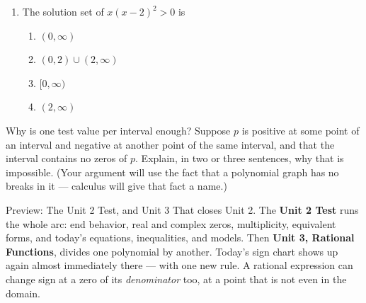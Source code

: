 \documentclass[10pt]{article}
\begin{document}
\begin{enumerate}[itemsep=10pt]
\begin{enumerate}[label=(\alph*), itemsep=6pt]
  \item First differences: \blank{6cm}
  \item Second differences: \blank{5cm}
  \item Third differences: \blank{4cm}
  \item Which regression --- linear, quadratic, cubic, or quartic --- fits this
        data exactly, and how do the differences tell you?
        \quad \blank{5cm}
  \item The calculator returns the coefficients. Name one thing it does
        \textit{not} decide for you. \quad \blank{5cm}
\end{enumerate}

\item The solution set of $x(x-2)^2 > 0$ is

\begin{enumerate}[label=\Alph*., itemsep=3pt]
  \item $(0, \infty)$
  \item $(0,2) \cup (2,\infty)$
  \item $[0, \infty)$
  \item $(2, \infty)$
\end{enumerate}

\end{enumerate}

\vspace{0.1in}

\boxguard
\begin{extensionbox}
Why is one test value per interval enough? Suppose $p$ is positive at some
point of an interval and negative at another point of the same interval, and
that the interval contains no zeros of $p$. Explain, in two or three sentences,
why that is impossible. (Your argument will use the fact that a polynomial
graph has no breaks in it --- calculus will give that fact a name.)

\vspace{0.05in}
\end{extensionbox}

\vspace{0.1in}

\boxguard
\begin{notesbox}{Preview: The Unit 2 Test, and Unit 3}
That closes Unit 2. The \textbf{Unit 2 Test} runs the whole arc: end behavior,
real and complex zeros, multiplicity, equivalent forms, and today's equations,
inequalities, and models. Then \textbf{Unit 3, Rational Functions}, divides one
polynomial by another. Today's sign chart shows up again almost immediately
there --- with one new rule. A rational expression can change sign at a zero of
its \textit{denominator} too, at a point that is not even in the domain.
\end{notesbox}
\end{document}
